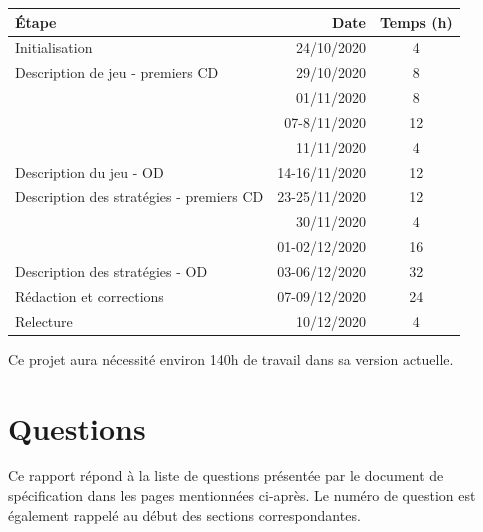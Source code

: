 \documentclass[oneside,a4paper]{book}
\begin{document}
\begin{center}
\begin{tabular}{|l|r|c|}
\hline \textbf{Étape} & \textbf{Date} & \textbf{Temps (h)} \\\hline
Initialisation & 24/10/2020 & 4\\\hline
Description de jeu - premiers CD & 29/10/2020 & 8\\
 & 01/11/2020 & 8\\
 & 07-8/11/2020 & 12\\
 & 11/11/2020 & 4\\\hline
Description du jeu - OD & 14-16/11/2020 & 12\\\hline
Description des stratégies - premiers CD & 23-25/11/2020 & 12\\
 & 30/11/2020 & 4\\
 & 01-02/12/2020 & 16\\\hline
Description des stratégies - OD & 03-06/12/2020 & 32\\\hline
Rédaction et corrections & 07-09/12/2020 & 24\\\hline
 Relecture & 10/12/2020 & 4\\\hline
\end{tabular}
\end{center}

Ce projet aura nécessité environ 140h de travail dans sa version actuelle.

\section*{Questions}

Ce rapport répond à la liste de questions présentée par le document de spécification dans les pages mentionnées ci-après. Le numéro de question est également rappelé au début des sections correspondantes.
\end{document}
